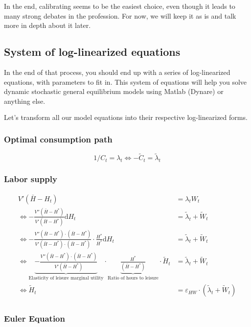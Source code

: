\documentclass[12pt]{report}
\def\D{\mathrm{d}}
\def\D{\mathrm{d}}
\begin{document}
In the end, calibrating seems to be the easiest choice, even though it leads to many strong debates in the profession. For now, we will keep it as is and talk more in depth about it later. 

\subsection{System of log-linearized equations}

In the end of that process, you should end up with a series of log-linearized equations, with parameters to fit in. This system of equations will help you solve dynamic stochastic general equilibrium models using Matlab (Dynare) or anything else.

Let's transform all our model equations into their respective log-linearized forms.

\subsubsection{Optimal consumption path}

$$1/C_t = \lambda_t \Leftrightarrow - \tilde C_t = \tilde \lambda_t $$

\subsubsection{Labor supply}

\begin{align*}
V'(\bar H - H_t) & = \lambda_t W_t \\
\Leftrightarrow- \frac{V''(\bar H - H^*)}{V'(\bar H - H^*)}\D H_t & = \tilde\lambda_t + \tilde W_t \\
\Leftrightarrow- \frac{V''(\bar H - H^*)\cdot (\bar H - H^*)}{V'(\bar H - H^*)\cdot (\bar H - H^*)}\cdot\frac{H^*}{H^*} \D H_t & = \tilde\lambda_t + \tilde W_t \\
\Leftrightarrow\underbrace{-\frac{V''(\bar H - H^*)\cdot (\bar H - H^*)}{V'(\bar H - H^*)}}_{\text{Elasticity of leisure marginal utility}} \cdot \underbrace{\frac{H^*}{(\bar H - H^*)}}_{\text{Ratio of hours to leisure}}\cdot \tilde H_t & = \tilde\lambda_t + \tilde W_t \\
\Leftrightarrow\tilde H_t & = \varepsilon_{HW} \cdot (\tilde\lambda_t + \tilde W_t) \\
\end{align*} 

\subsubsection{Euler Equation}
\end{document}
